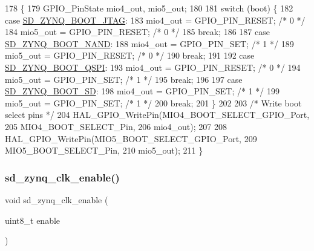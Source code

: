 \begin{DoxyCode}
178 \{
179     GPIO\_PinState mio4\_out, mio5\_out;
180   
181     \textcolor{keywordflow}{switch} (boot) \{
182     \textcolor{keywordflow}{case} \mbox{\hyperlink{group___s_d___platform_gga06667de95c86bfcdef8bcc8ab13cb2d4aa0c510b780474f1292f04a8b7b987a76}{SD\_ZYNQ\_BOOT\_JTAG}}:
183         mio4\_out = GPIO\_PIN\_RESET;      \textcolor{comment}{/* 0 */}
184         mio5\_out = GPIO\_PIN\_RESET;      \textcolor{comment}{/* 0 */}
185         \textcolor{keywordflow}{break};
186     
187     \textcolor{keywordflow}{case} \mbox{\hyperlink{group___s_d___platform_gga06667de95c86bfcdef8bcc8ab13cb2d4ad270040d99cf171dc127ebca46e82c54}{SD\_ZYNQ\_BOOT\_NAND}}:
188         mio4\_out = GPIO\_PIN\_SET;    \textcolor{comment}{/* 1 */}
189         mio5\_out = GPIO\_PIN\_RESET;      \textcolor{comment}{/* 0 */}
190         \textcolor{keywordflow}{break};
191     
192     \textcolor{keywordflow}{case} \mbox{\hyperlink{group___s_d___platform_gga06667de95c86bfcdef8bcc8ab13cb2d4a85166851f8dac48bd3b4261debe97472}{SD\_ZYNQ\_BOOT\_QSPI}}:
193         mio4\_out = GPIO\_PIN\_RESET;      \textcolor{comment}{/* 0 */}
194         mio5\_out = GPIO\_PIN\_SET;    \textcolor{comment}{/* 1 */}
195         \textcolor{keywordflow}{break};
196     
197     \textcolor{keywordflow}{case} \mbox{\hyperlink{group___s_d___platform_gga06667de95c86bfcdef8bcc8ab13cb2d4af1351df506cd9586ffcd35813fa3f5f9}{SD\_ZYNQ\_BOOT\_SD}}:
198         mio4\_out = GPIO\_PIN\_SET;    \textcolor{comment}{/* 1 */}
199         mio5\_out = GPIO\_PIN\_SET;    \textcolor{comment}{/* 1 */}
200         \textcolor{keywordflow}{break};
201     \}
202  
203     \textcolor{comment}{/* Write boot select pins */}
204     HAL\_GPIO\_WritePin(MIO4\_BOOT\_SELECT\_GPIO\_Port,
205               MIO4\_BOOT\_SELECT\_Pin,
206               mio4\_out);
207     
208     HAL\_GPIO\_WritePin(MIO5\_BOOT\_SELECT\_GPIO\_Port, 
209               MIO5\_BOOT\_SELECT\_Pin,
210               mio5\_out);
211 \}
\end{DoxyCode}
\mbox{\label{group___s_d___platform___function___declarations_gaf9291353913fb90687c915313dea1a0c}} 
\subsubsection{\texorpdfstring{sd\+\_\+zynq\+\_\+clk\+\_\+enable()}{sd\_zynq\_clk\_enable()}}
{\footnotesize\ttfamily void sd\+\_\+zynq\+\_\+clk\+\_\+enable (\begin{DoxyParamCaption}\item[{uint8\+\_\+t}]{enable }\end{DoxyParamCaption})}



